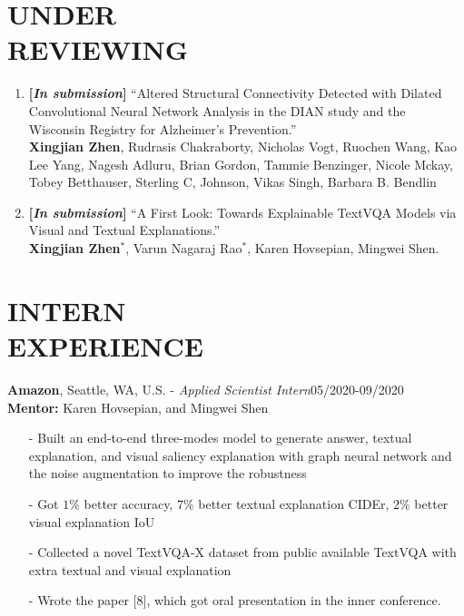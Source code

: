 \documentclass[margin]{res}
\begin{document}
\begin{resume}
\vspace{-2em}                
\section{UNDER\\ REVIEWING}
				\begin{enumerate}[noitemsep,wide=0pt,leftmargin=\dimexpr\labelwidth + 2\labelsep\relax]\itemsep -0.0pt
				\setcounter{enumi}{6}
				\item \textbf{[\emph{In submission}]} ``Altered Structural Connectivity Detected with Dilated Convolutional Neural Network Analysis in the DIAN study and the Wisconsin Registry for Alzheimer's Prevention.''\\
                            \textbf{Xingjian Zhen}, Rudrasis Chakraborty, Nicholas Vogt, Ruochen Wang, Kao Lee Yang, Nagesh Adluru, Brian Gordon, Tammie Benzinger, Nicole Mckay, Tobey Betthauser, Sterling C, Johnson, Vikas Singh, Barbara B. Bendlin
                \item \textbf{[\emph{In submission}]} ``A First Look: Towards Explainable TextVQA Models via Visual and Textual Explanations.''\\
                            \textbf{Xingjian Zhen}$^*$, Varun Nagaraj Rao$^*$, Karen Hovsepian, Mingwei Shen.
                \end{enumerate}

\vspace{-1em}
\section{INTERN \\ EXPERIENCE}
                \textbf{Amazon}, Seattle, WA, U.S. - {\it Applied Scientist Intern}\hfill 05/2020-09/2020\\
                \textbf{Mentor:} Karen Hovsepian, and Mingwei Shen
                \begin{itemize}\itemsep -2.2pt %
                \item[-] Built an end-to-end three-modes model to generate answer, textual explanation, and visual saliency explanation with graph neural network and the noise augmentation to improve the robustness
                \item[-] Got $1\%$ better accuracy, $7\%$ better textual explanation CIDEr, $2\%$ better visual explanation IoU
                 \item[-] Collected a novel TextVQA-X dataset from public available TextVQA with extra textual and visual explanation
                 \item[-] Wrote the paper [8], which got oral presentation in the inner conference. 
                 \end{itemize}
                

\end{resume}
\end{document}
